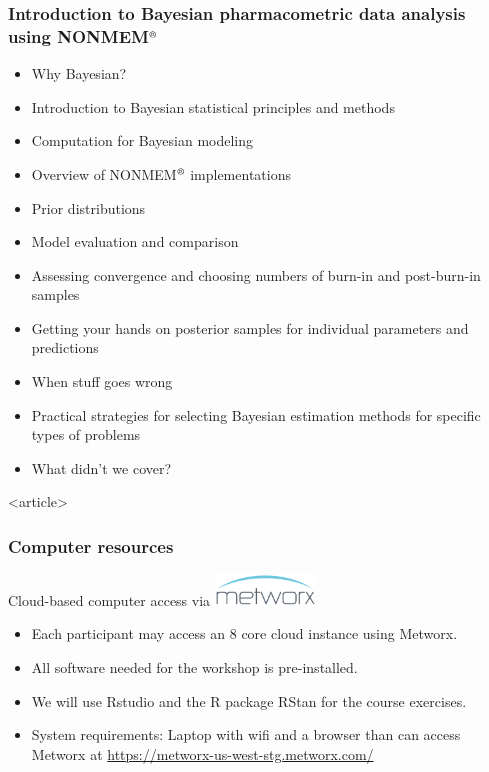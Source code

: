 \documentclass[handout]{beamer}
\begin{document}
\begin{frame}
  \frametitle{Introduction to Bayesian pharmacometric data analysis
    using NONMEM$^\text{\textregistered}$}
  
  \begin{itemize}
\item Why Bayesian?
  \item Introduction to Bayesian statistical principles and methods
  \item Computation for Bayesian modeling
  \item Overview of NONMEM$^\text{\textregistered}$ implementations
  \item Prior distributions
  \item Model evaluation and comparison
  \item Assessing convergence and choosing numbers of burn-in and
    post-burn-in samples
  \item Getting your hands on posterior samples for individual
    parameters and predictions
  \end{itemize}
  \begin{itemize}
  \item When stuff goes wrong
  \item Practical strategies for selecting Bayesian estimation methods
    for specific types of problems
  \item What didn't we cover?
  \end{itemize}

\end{frame}


\begin{frame}<article>
  \frametitle{Computer resources}

Cloud-based computer access via \href{http://metrumrg.com/solution/metworx/}{\includegraphics[width=0.2\textwidth]{graphics/metworx.pdf}} 
\begin{itemize}
\item Each participant may access an 8 core cloud instance using
  Metworx.
\item All software needed for the workshop is pre-installed.
\item We will use Rstudio and the R package RStan for the course
  exercises.
\item System requirements: Laptop with wifi and a browser than can
  access Metworx at \url{https://metworx-us-west-stg.metworx.com/}
\end{itemize}
  
\end{frame}
\end{document}
